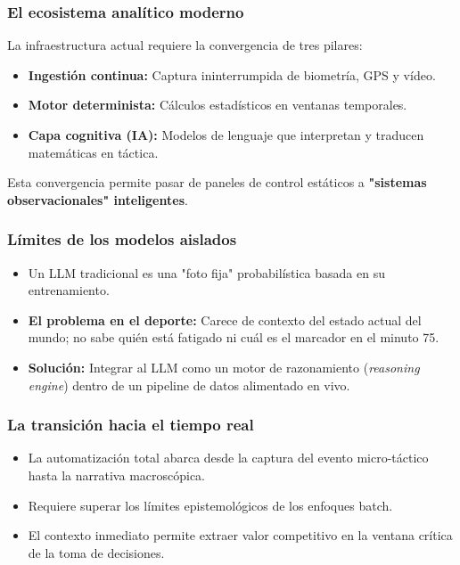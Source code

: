 \documentclass[aspectratio=169]{beamer}
\begin{document}
\begin{frame}\frametitle{El ecosistema analítico moderno}
La infraestructura actual requiere la convergencia de tres pilares:
\begin{itemize}
    \item \textbf{Ingestión continua:} Captura ininterrumpida de biometría, GPS y vídeo.
    \item \textbf{Motor determinista:} Cálculos estadísticos en ventanas temporales.
    \item \textbf{Capa cognitiva (IA):} Modelos de lenguaje que interpretan y traducen matemáticas en táctica.
\end{itemize}
Esta convergencia permite pasar de paneles de control estáticos a \textbf{"sistemas observacionales" inteligentes}.
\end{frame}

\begin{frame}\frametitle{Límites de los modelos aislados}
\begin{itemize}
    \item Un LLM tradicional es una "foto fija" probabilística basada en su entrenamiento.
    \item \textbf{El problema en el deporte:} Carece de contexto del estado actual del mundo; no sabe quién está fatigado ni cuál es el marcador en el minuto 75.
    \item \textbf{Solución:} Integrar al LLM como un motor de razonamiento (\textit{reasoning engine}) dentro de un pipeline de datos alimentado en vivo.
\end{itemize}
\end{frame}

\begin{frame}\frametitle{La transición hacia el tiempo real}
\begin{itemize}
    \item La automatización total abarca desde la captura del evento micro-táctico hasta la narrativa macroscópica.
    \item Requiere superar los límites epistemológicos de los enfoques batch.
    \item El contexto inmediato permite extraer valor competitivo en la ventana crítica de la toma de decisiones.
\end{itemize}
\end{frame}
\end{document}
